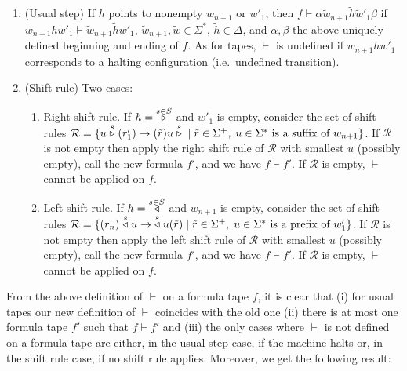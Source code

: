 \begin{enumerate}
    \item (Usual step) If $h$ points to nonempty $w_{n+1}$ or $w'_1$, then $f \vdash \alpha \tilde{w}_{n+1} \tilde{h} \tilde{w}'_1\beta$ if $w_{n+1} h w'_1 \vdash \tilde{w}_{n+1} \tilde{h} w'_1$, $\tilde{w}_{n+1}, \tilde{w} \in \Sigma^*$, $\tilde{h} \in \Delta$, and $\alpha, \beta$ the above uniquely-defined beginning and ending of $f$. As for tapes, $\vdash$ is undefined if $w_{n+1} h w'_1$ corresponds to a halting configuration (i.e.\ undefined transition).
    \item (Shift rule) Two cases:
          \begin{enumerate}

              \item Right shift rule. If $h=\;\stackrel{s\in S}\triangleright$ and $w'_1$ is empty, consider the set of shift rules $\mathcal{R} = \{ u \stackrel{s}\triangleright(r'_1) \to (\tilde{r})u\stackrel{s}\triangleright \; | \; \tilde{r}\in\Sigma^+,\; u\in\Sigma^* \text{ is a suffix of } w_{n+1}\}$. If $\mathcal{R}$ is not empty then apply the right shift rule of $\mathcal{R}$ with smallest $u$ (possibly empty), call the new formula $f'$, and we have $f \vdash f'$. If $\mathcal{R}$ is empty, $\vdash$ cannot be applied on $f$.
              \item Left shift rule. If $h=\;\stackrel{s\in S}\triangleleft$ and $w_{n+1}$ is empty, consider the set of shift rules $\mathcal{R} = \{ (r_{n})\stackrel{s}\triangleleft u \to \;\stackrel{s}\triangleleft u(\tilde{r}) \; | \; \tilde{r}\in\Sigma^+,\; u\in\Sigma^* \text{ is a prefix of } w'_{1}\}$. If $\mathcal{R}$ is not empty then apply the left shift rule of $\mathcal{R}$ with smallest $u$ (possibly empty), call the new formula $f'$, and we have $f \vdash f'$. If $\mathcal{R}$ is empty, $\vdash$ cannot be applied on $f$.

          \end{enumerate}

\end{enumerate}

From the above definition of $\vdash$ on a formula tape $f$, it is clear that (i) for usual tapes our new definition of $\vdash$ coincides with the old one (ii) there is at most one formula tape $f'$ such that $f \vdash f'$ and (iii) the only cases where $\vdash$ is not defined on a formula tape are either, in the usual step case, if the machine halts or, in the shift rule case, if no shift rule applies. Moreover, we get the following result:

